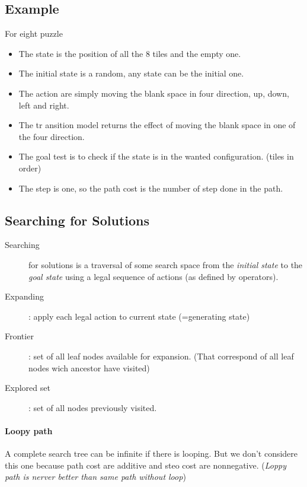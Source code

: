 \subsection{Example}
For eight puzzle
\begin{itemize}
\item The state is the position of all the 8 tiles and the empty one.
\item The initial state is a random, any state can be the initial one.
\item The action are simply moving the blank space in four direction, up, down, left and right.
\item The tr	ansition model returns the effect of moving the blank space in one of the four direction.
\item The goal test is to check if the state is in the wanted configuration. (tiles in order)
\item The step is one, so the path cost is the number of step done in the path.
\end{itemize}

\subsection{Searching for Solutions}

\begin{description}

    \item[Searching] for solutions  is a traversal of  some search space
    from the \textit{initial  state} to the \textit{goal  state} using a
    legal sequence of actions (as defined by operators).

    \item[Expanding]  :  apply  each   legal  action  to  current  state
    (=generating state)

    \item[Frontier] : set of all leaf nodes available for expansion. 
        (That correspond of all leaf nodes wich ancestor have visited)

    \item[Explored set] : set of all nodes previously visited. 
\end{description}

\paragraph{Loopy path} A  complete search tree can be  infinite if there
is  looping. But  we  don't considere  this one  because  path cost  are
additive and  steo cost are  nonnegative. (\textit{Loppy path  is nerver
better than same path without loop})

